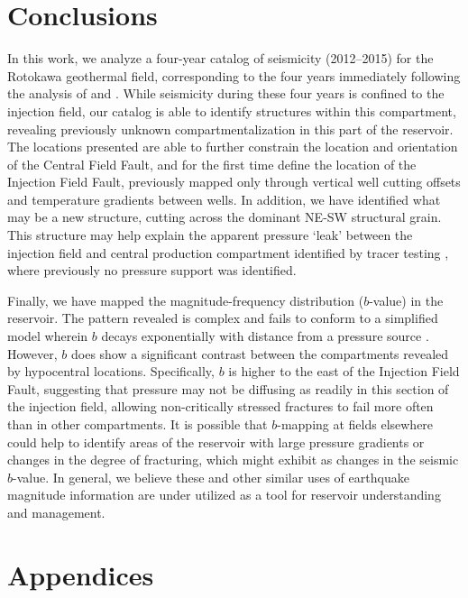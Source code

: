 \section{Conclusions}
In this work, we analyze a four-year catalog of seismicity (2012--2015) for the Rotokawa geothermal field, corresponding to the four years immediately following the analysis of \citet{Sherburn_2015} and \citet{Sewell_2015WGC}. While seismicity during these four years is confined to the injection field, our catalog is able to identify structures within this compartment, revealing previously unknown compartmentalization in this part of the reservoir. The locations presented are able to further constrain the location and orientation of the Central Field Fault, and for the first time define the location of the Injection Field Fault, previously mapped only through vertical well cutting offsets and temperature gradients between wells. In addition, we have identified what may be a new structure, cutting across the dominant NE-SW structural grain. This structure may help explain the apparent pressure `leak' between the injection field and central production compartment identified by tracer testing \citep{Addison_2017stanford}, where previously no pressure support was identified.

Finally, we have mapped the magnitude-frequency distribution ($b$-value) in the reservoir. The pattern revealed is complex and fails to conform to a simplified model wherein $b$ decays exponentially with distance from a pressure source \citep{Bachmann_2012}. However, $b$ does show a significant contrast between the compartments revealed by hypocentral locations. Specifically, $b$ is higher to the east of the Injection Field Fault, suggesting that pressure may not be diffusing as readily in this section of the injection field, allowing non-critically stressed fractures to fail more often than in other compartments. It is possible that $b$-mapping at fields elsewhere could help to identify areas of the reservoir with large pressure gradients or changes in the degree of fracturing, which might exhibit as changes in the seismic $b$-value. In general, we believe these and other similar uses of earthquake magnitude information are under utilized as a tool for reservoir understanding and management.

\section{Appendices}
